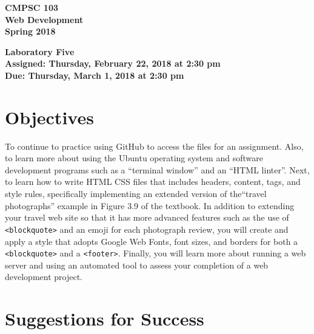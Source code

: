 \documentclass[11pt]{article}
\newcommand{\assignmentduedate}{March 1}
\newcommand{\assignmentassignedate}{February 22}
\newcommand{\assignmentnumber}{Five}
\newcommand{\labyear}{2018}
\newcommand{\labday}{Thursday}
\newcommand{\labtime}{2:30 pm}
\newcommand{\assigneddate}{Assigned: \labday, \assignmentassignedate, \labyear{} at \labtime{}}
\newcommand{\duedate}{Due: \labday, \assignmentduedate, \labyear{} at \labtime{}}
\newcommand{\program}[1]{\lstinline{#1}}
\newcommand{\labtitle}[1]
{
  \begin{center}
    \begin{center}
      \bf
      CMPSC 103\\Web Development\\
      Spring 2018\\
      \medskip
    \end{center}
    \bf
    #1
  \end{center}
}
\begin{document}
\thispagestyle{empty}

\labtitle{Laboratory \assignmentnumber{} \\ \assigneddate{} \\ \duedate{}}

\section*{Objectives}

To continue to practice using GitHub to access the files for an assignment.
Also, to learn more about using the Ubuntu operating system and software
development programs such as a ``terminal window'' and an ``HTML linter''. Next,
to learn how to write HTML CSS files that includes headers, content, tags, and
style rules, specifically implementing an extended version of the``travel
photographs'' example in Figure 3.9 of the textbook. In addition to extending
your travel web site so that it has more advanced features such as the use of
\program{<blockquote>} and an emoji for each photograph review, you will create
and apply a style that adopts Google Web Fonts, font sizes, and borders for both
a \program{<blockquote>} and a \program{<footer>}. Finally, you will learn more
about running a web server and using an automated tool to assess your completion
of a web development project.

\section*{Suggestions for Success}
\end{document}
